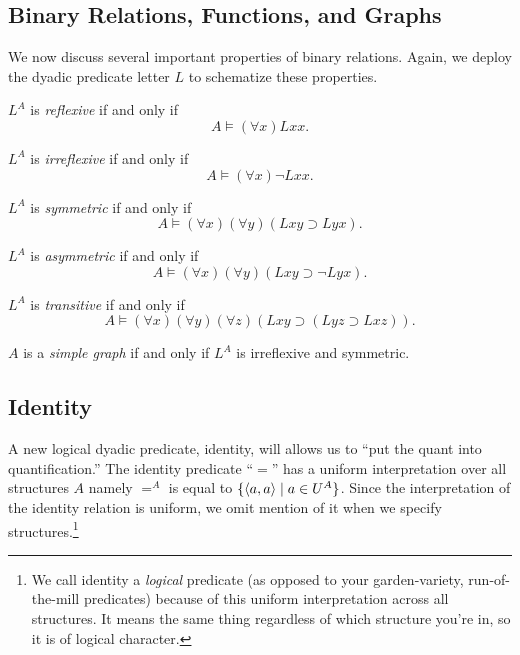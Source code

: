 \subsection{Binary Relations, Functions, and Graphs}
We now discuss several important properties of binary relations. Again, we deploy the dyadic predicate letter $L$ to schematize these properties. 
\begin{definition}
$L^A$ is \emph{reflexive} if and only if
\[A\models (\forall x)Lxx.\]
\end{definition}

\begin{definition}
$L^A$ is \emph{irreflexive} if and only if
\[A\models (\forall x)\neg Lxx.\]
\end{definition}

\begin{definition}
$L^A$ is \emph{symmetric} if and only if
\[A\models (\forall x)(\forall y)(Lxy\supset Lyx).\]
\end{definition}

\begin{definition}
$L^A$ is \emph{asymmetric} if and only if
\[A\models (\forall x)(\forall y)(Lxy\supset \neg Lyx).\]
\end{definition}

\begin{definition}
$L^A$ is \emph{transitive} if and only if
\[A\models (\forall x)(\forall y)(\forall z)(Lxy\supset (Lyz\supset Lxz)).\]
\end{definition}

\begin{definition}
$A$ is a \emph{simple graph} if and only if $L^A$ is irreflexive and symmetric.
\end{definition}

\subsection*{Identity}
A new logical dyadic predicate, identity, will  allows us to ``put the quant into quantification.'' The identity predicate ``$=$'' has a uniform interpretation over all structures $A$ namely $=^A$ is equal to $\{\mbox{$\langle a,a \rangle$}\mid a\in U^A\}$. Since the interpretation of the identity relation is uniform, we omit mention of it when we specify structures.\footnote{We call identity a \emph{logical} predicate (as opposed to your garden-variety, run-of-the-mill predicates) because of this uniform interpretation across all structures. It means the same thing regardless of which structure you're in, so it is of logical character.}
\iffalse
\begin{aside}
    Identity is, of course, an equivalence relation. Prove this. 
\end{aside}
\fi
